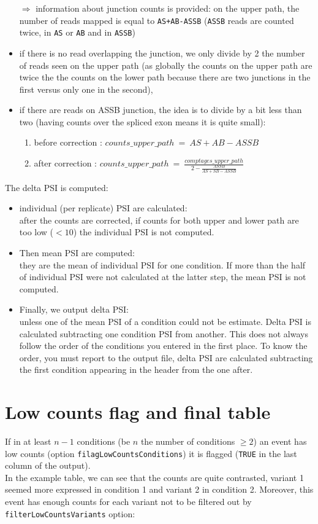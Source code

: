 \documentclass[english, a4paper, 12pt]{article}
\begin{document}
\begin{itemize}
 $\Rightarrow$ information about junction counts is provided: on the upper path, the number of reads mapped is equal to \texttt{AS+AB-ASSB} (\texttt{ASSB} reads are counted twice, in \texttt{AS} or \texttt{AB} and in \texttt{ASSB})
  \item if there is no read overlapping the junction, we only divide by 2 the number of reads seen on the upper path (as globally the counts on the upper path are twice the the counts on the lower path because there are two junctions in the first versus only one in the second), 
  \item if there are reads on ASSB junction, the idea is to divide by a bit less than two (having counts over the spliced exon means it is quite small):
  \begin{enumerate}
    \item before correction : $counts\_upper\_path \:=\: AS+AB-ASSB $
    \item after correction : $counts\_upper\_path\:=\:\frac{comptages\_upper\_path}{2-\frac{ASSB}{AS+SB-ASSB}}$
  \end{enumerate}
 \end{itemize}
 
The delta PSI is computed:
 \begin{itemize}
\item individual (per replicate) PSI are calculated:\\
after the counts are corrected, if counts for both upper and lower path are too low ($<10$) the individual PSI is not computed.
\item Then mean PSI are computed:\\
they are the mean of individual PSI for one condition. If more than the half of individual PSI were not calculated at the latter step, the mean PSI is not computed.
\item Finally, we output delta PSI:\\
unless one of the mean PSI of a condition could not be estimate. Delta PSI is calculated subtracting one condition PSI from another. This does not always follow the order of the conditions you entered in the first place. To know the order, you must report to the output file, delta PSI are calculated subtracting the first condition appearing in the header from the one after.
\end{itemize}


\section{Low counts flag and final table}
If in at least $n-1$ conditions (be $n$ the number of conditions $\geq 2$) an event has low counts (option \texttt{filagLowCountsConditions}) it is flagged (\texttt{TRUE} in the last column of the output).\\
In the example table, we can see that the counts are quite contrasted, variant 1 seemed more expressed in condition 1 and variant 2 in condition 2. Moreover, this event has enough counts for each variant not to be filtered out by \texttt{filterLowCountsVariants} option:\\
\end{document}
